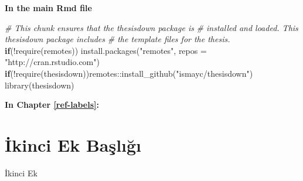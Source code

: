 \documentclass[12pt,twoside]{deuthesis}
\newenvironment{Shaded}{\begin{snugshade}}{\end{snugshade}}
\newcommand{\AttributeTok}[1]{\textcolor[rgb]{0.77,0.63,0.00}{#1}}
\newcommand{\CommentTok}[1]{\textcolor[rgb]{0.56,0.35,0.01}{\textit{#1}}}
\newcommand{\ControlFlowTok}[1]{\textcolor[rgb]{0.13,0.29,0.53}{\textbf{#1}}}
\newcommand{\FunctionTok}[1]{\textcolor[rgb]{0.00,0.00,0.00}{#1}}
\newcommand{\NormalTok}[1]{#1}
\newcommand{\SpecialCharTok}[1]{\textcolor[rgb]{0.00,0.00,0.00}{#1}}
\newcommand{\StringTok}[1]{\textcolor[rgb]{0.31,0.60,0.02}{#1}}
\begin{document}
\textbf{In the main Rmd file}
\begin{Shaded}
\begin{Highlighting}[]
\CommentTok{\# This chunk ensures that the thesisdown package is}
\CommentTok{\# installed and loaded. This thesisdown package includes}
\CommentTok{\# the template files for the thesis.}
 \ControlFlowTok{if}\NormalTok{(}\SpecialCharTok{!}\FunctionTok{require}\NormalTok{(remotes)) }\FunctionTok{install.packages}\NormalTok{(}\StringTok{"remotes"}\NormalTok{, }\AttributeTok{repos =} \StringTok{"http://cran.rstudio.com"}\NormalTok{)}
 \ControlFlowTok{if}\NormalTok{(}\SpecialCharTok{!}\FunctionTok{require}\NormalTok{(thesisdown))remotes}\SpecialCharTok{::}\FunctionTok{install\_github}\NormalTok{(}\StringTok{"ismayc/thesisdown"}\NormalTok{)}
 \FunctionTok{library}\NormalTok{(thesisdown)}
\end{Highlighting}
\end{Shaded}
\textbf{In Chapter \ref{ref-labels}:}

\hypertarget{ikinci-ek-baux15flux131ux11fux131}{%
\chapter{İkinci Ek Başlığı}\label{ikinci-ek-baux15flux131ux11fux131}}

İkinci Ek
\end{document}
